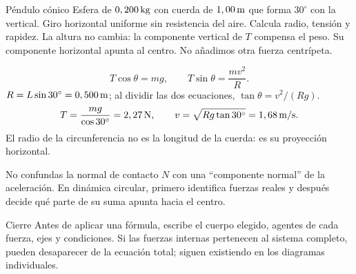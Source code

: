 \documentclass[11pt,a4paper]{article}
\begin{document}
\begin{examplebox}{P\'endulo c\'onico}
 Esfera de $0,200\,\mathrm{kg}$ con cuerda de $1,00\,\mathrm{m}$ que forma $30^\circ$ con la vertical. Giro horizontal uniforme sin resistencia del aire. Calcula radio, tensi\'on y rapidez.
\solutionblock
{} La altura no cambia: la componente vertical de $T$ compensa el peso.
Su componente horizontal apunta al centro. No a\~nadimos otra fuerza centr\'ipeta.
\begin{center}
\end{center}
\[
T\cos\theta=mg,\qquad T\sin\theta=\frac{mv^2}{R}.
\]
 $R=L\sin30^\circ=0,500\,\mathrm{m}$; al dividir las dos
ecuaciones, $\tan\theta=v^2/(Rg)$.
\[
T=\frac{mg}{\cos30^\circ}=2,27\,\mathrm{N},\qquad
v=\sqrt{Rg\tan30^\circ}=1,68\,\mathrm{m/s}.
\]
 El radio de la circunferencia no es la longitud de la cuerda: es su proyecci\'on horizontal.
\end{examplebox}

\begin{warnbox}
No confundas la normal de contacto $N$ con una ``componente normal'' de la aceleraci\'on. En din\'amica circular, primero identifica fuerzas reales y despu\'es decide qu\'e parte de su suma apunta hacia el centro.
\end{warnbox}

\begin{lessoncard}{Cierre}
Antes de aplicar una f\'ormula, escribe el cuerpo elegido, agentes de cada fuerza, ejes y condiciones. Si las fuerzas internas pertenecen al sistema completo, pueden desaparecer de la ecuaci\'on total; siguen existiendo en los diagramas individuales.
\end{lessoncard}
\end{document}
